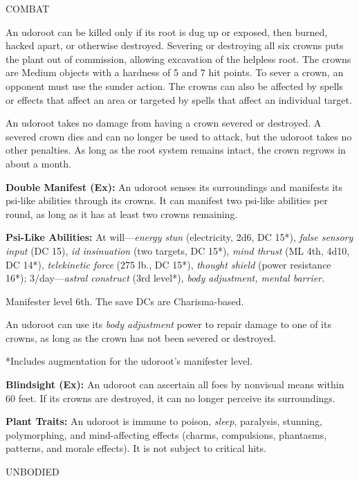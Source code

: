 \documentclass{article}
\begin{document}
COMBAT

An udoroot can be killed only if its root is dug up or exposed, then burned, hacked 
apart, or otherwise destroyed. Severing or destroying all six crowns puts the plant 
out of commission, allowing excavation of the helpless root. The crowns are Medium 
objects with a hardness of 5 and 7 hit points. To sever a crown, an opponent must 
use the sunder action. The crowns can also be affected by spells or effects that 
affect an area or targeted by spells that affect an individual target.

An udoroot takes no damage from having a crown severed or destroyed. A severed 
crown dies and can no longer be used to attack, but the udoroot takes no other 
penalties.  As long as the root system remains intact, the crown regrows in about 
a month.

\textbf{Double Manifest (Ex):} An udoroot senses its surroundings and manifests 
its psi-like abilities through its crowns. It can manifest two psi-like abilities 
per round, as long as it has at least two crowns remaining.

\textbf{Psi-Like Abilities:} At will---\textit{energy stun }(electricity, 2d6, 
DC 15*), \textit{false sensory input }(DC 15), \textit{id insinuation }(two targets, 
DC 15*), \textit{mind thrust }(ML 4th, 4d10, DC 14*), \textit{telekinetic force 
}(275 lb., DC 15*), \textit{thought shield }(power resistance 16*); 3/day---\textit{astral 
construct }(3rd level*), \textit{body adjustment, mental barrier. }

Manifester level 6th. The save DCs are Charisma-based. 

An udoroot can use its \textit{body adjustment }power to repair damage to one of 
its crowns, as long as the crown has not been severed or destroyed.

*Includes augmentation for the udoroot's manifester level.

\textbf{Blindsight (Ex): }An udoroot can ascertain all foes by nonvisual means 
within 60 feet. If its crowns are destroyed, it can no longer perceive its surroundings.

\textbf{Plant Traits:} An udoroot is immune to poison, \textit{sleep}, paralysis, 
stunning, polymorphing, and mind-affecting effects (charms, compulsions, phantasms, 
patterns, and morale effects). It is not subject to critical hits.

\vspace{12pt}
{\LARGE{}UNBODIED}
\end{document}
